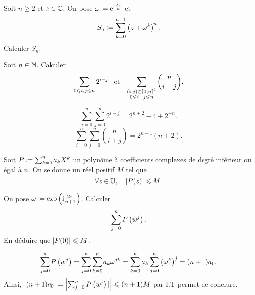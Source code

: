 \documentclass{magnolia}
\begin{document}


Soit $n\geq 2$ et $z\in\mathbb{C}$. On pose $\omega\coloneqq {\rm e}^{{\rm i}\frac{2\pi}{n}}$ et
\[S_n\coloneqq \sum_{k=0}^{n-1} \left(z+\omega^k\right)^n.\]
Calculer $S_n$.


Soit $n\in\mathbb{N}$. Calculer
\[\sum_{0 \leqslant i,j \leqslant n} 2^{i-j} \quad\!\text{et}\quad\! \sum_{\substack{(i,j)\in\left\llbracket 0,n\right\rrbracket^2\\0\leqslant i+j \leqslant n}} \binom{n}{i+j}.\]
\begin{sol}
\begin{questions}
\question
\[\sum_{i=0}^n \sum_{j=0}^n 2^{i-j}=2^{n+2}-4+2^{-n}.\]
\question
\[\sum_{i=0}^n \sum_{j=0}^n \binom{n}{i+j}=2^{n-1}(n+2).\]
\end{questions}
\end{sol}

Soit $P\coloneqq\sum_{k=0}^n a_k X^k$ un polynôme à coefficients complexes de degré inférieur ou égal à $n$. On se donne un réel positif $M$ tel que
$$\forall z\in\U \qsep \abs{P(z)}\leq M.$$
\begin{questions}
\question On pose $\omega\coloneqq\exp\left({\rm i}\frac{2\pi}{n+1}\right)$. Calculer
  $$\sum_{j=0}^n P\left(w^j\right).$$
\question En déduire que $\left|P(0)\right|\leqslant M$.
\end{questions}

\begin{sol}
\begin{questions}
\question 
  $$\sum_{j=0}^n P\left(w^j\right)=\sum_{j=0}^n\sum_{k=0}^na_k\omega^{jk}=\sum_{k=0}^na_k\sum_{j=0}^n\left(\omega^{k}\right)^j=(n+1)a_0.$$
\question Ainsi, $|(n+1)a_0|=\left|\sum_{j=0}^n P\left(w^j\right)|\right|\leqslant (n+1)M$ par I.T permet de conclure.
\end{questions}


\end{sol}
\end{document}
